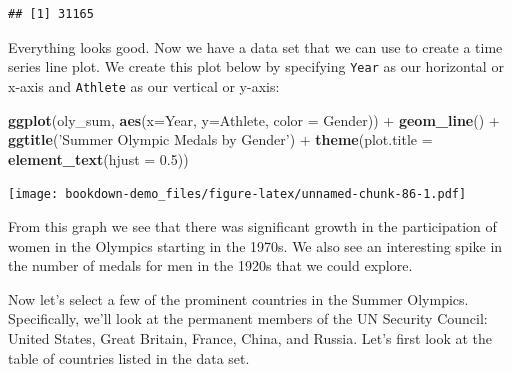 \documentclass[]{book}
\newenvironment{Shaded}{\begin{snugshade}}{\end{snugshade}}
\newcommand{\KeywordTok}[1]{\textcolor[rgb]{0.13,0.29,0.53}{\textbf{{#1}}}}
\newcommand{\DataTypeTok}[1]{\textcolor[rgb]{0.13,0.29,0.53}{{#1}}}
\newcommand{\FloatTok}[1]{\textcolor[rgb]{0.00,0.00,0.81}{{#1}}}
\newcommand{\StringTok}[1]{\textcolor[rgb]{0.31,0.60,0.02}{{#1}}}
\newcommand{\NormalTok}[1]{{#1}}
\begin{document}
\begin{Shaded}
\end{Shaded}

\begin{verbatim}
## [1] 31165
\end{verbatim}

Everything looks good. Now we have a data set that we can use to create
a time series line plot. We create this plot below by specifying
\texttt{Year} as our horizontal or x-axis and \texttt{Athlete} as our
vertical or y-axis:

\begin{Shaded}
\begin{Highlighting}[]
\KeywordTok{ggplot}\NormalTok{(oly_sum, }\KeywordTok{aes}\NormalTok{(}\DataTypeTok{x=}\NormalTok{Year, }\DataTypeTok{y=}\NormalTok{Athlete, }\DataTypeTok{color =} \NormalTok{Gender)) +}\StringTok{ }
\StringTok{  }\KeywordTok{geom_line}\NormalTok{() +}\StringTok{ }\KeywordTok{ggtitle}\NormalTok{(}\StringTok{'Summer Olympic Medals by Gender'}\NormalTok{) +}\StringTok{ }
\StringTok{  }\KeywordTok{theme}\NormalTok{(}\DataTypeTok{plot.title =} \KeywordTok{element_text}\NormalTok{(}\DataTypeTok{hjust =} \FloatTok{0.5}\NormalTok{))}
\end{Highlighting}
\end{Shaded}

\texttt{[image: bookdown-demo\_files/figure-latex/unnamed-chunk-86-1.pdf]}

From this graph we see that there was significant growth in the
participation of women in the Olympics starting in the 1970s. We also
see an interesting spike in the number of medals for men in the 1920s
that we could explore.

Now let's select a few of the prominent countries in the Summer
Olympics. Specifically, we'll look at the permanent members of the UN
Security Council: United States, Great Britain, France, China, and
Russia. Let's first look at the table of countries listed in the data
set.

\begin{Shaded}
\end{Shaded}
\end{document}
